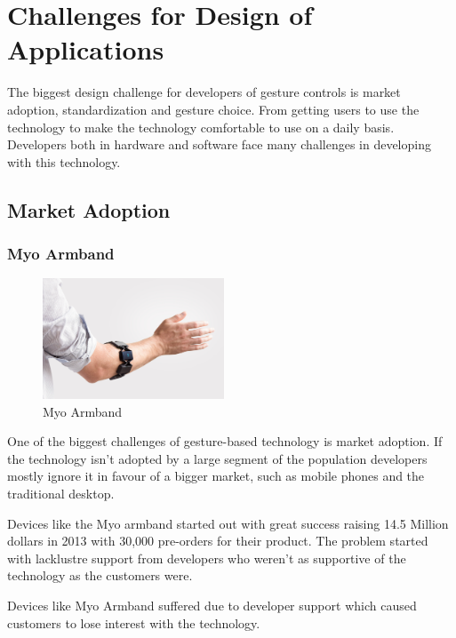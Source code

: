 \chapter{Challenges for Design of Applications}
The biggest design challenge for developers of gesture controls is market adoption, standardization and gesture choice. From getting users to use the technology to make the technology comfortable to use on a daily basis. Developers both in hardware and software face many challenges in developing with this technology.

\section{Market Adoption}

\subsection{Myo Armband}

\begin{figure}
  \begin{center}
    \includegraphics[width=0.48\textwidth]{img/myo.jpg}
  \end{center}
  \caption{Myo Armband}
\end{figure}

One of the biggest challenges of gesture-based technology is market adoption. If the technology isn't adopted by a large segment of the population developers mostly ignore it in favour of a bigger market, such as mobile phones and the traditional desktop.

Devices like the Myo armband started out with great success raising 14.5 Million dollars in 2013 with 30,000 pre-orders for their product. The problem started with lacklustre support from developers who weren't as supportive of the technology as the customers were. \cite{myosales}

Devices like Myo Armband suffered due to developer support which caused customers to lose interest with the technology.

